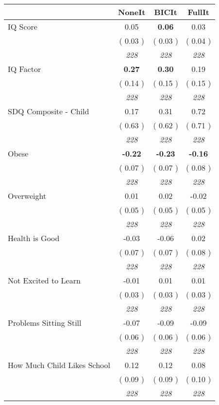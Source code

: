 \begin{tabular}{l c c c}
\toprule
 & NoneIt & BICIt & FullIt \\
\midrule
IQ Score &      0.05 & \textbf{      0.06 } &      0.03 \\
& (     0.03 ) & (     0.03 ) & (     0.04 ) \\
& \textit{ 228 } & \textit{ 228 } & \textit{ 228 } \\
IQ Factor & \textbf{      0.27 } & \textbf{      0.30 } &      0.19 \\
& (     0.14 ) & (     0.15 ) & (     0.15 ) \\
& \textit{ 228 } & \textit{ 228 } & \textit{ 228 } \\
SDQ Composite - Child &      0.17 &      0.31 &      0.72 \\
& (     0.63 ) & (     0.62 ) & (     0.71 ) \\
& \textit{ 228 } & \textit{ 228 } & \textit{ 228 } \\
Obese & \textbf{     -0.22 } & \textbf{     -0.23 } & \textbf{     -0.16 } \\
& (     0.07 ) & (     0.07 ) & (     0.08 ) \\
& \textit{ 228 } & \textit{ 228 } & \textit{ 228 } \\
Overweight &      0.01 &      0.02 &     -0.02 \\
& (     0.05 ) & (     0.05 ) & (     0.05 ) \\
& \textit{ 228 } & \textit{ 228 } & \textit{ 228 } \\
Health is Good &     -0.03 &     -0.06 &      0.02 \\
& (     0.07 ) & (     0.07 ) & (     0.08 ) \\
& \textit{ 228 } & \textit{ 228 } & \textit{ 228 } \\
Not Excited to Learn &     -0.01 &      0.01 &      0.01 \\
& (     0.03 ) & (     0.03 ) & (     0.03 ) \\
& \textit{ 228 } & \textit{ 228 } & \textit{ 228 } \\
Problems Sitting Still &     -0.07 &     -0.09 &     -0.09 \\
& (     0.06 ) & (     0.06 ) & (     0.06 ) \\
& \textit{ 228 } & \textit{ 228 } & \textit{ 228 } \\
How Much Child Likes School &      0.12 &      0.12 &      0.08 \\
& (     0.09 ) & (     0.09 ) & (     0.10 ) \\
& \textit{ 228 } & \textit{ 228 } & \textit{ 228 } \\
\bottomrule
\end{tabular}
